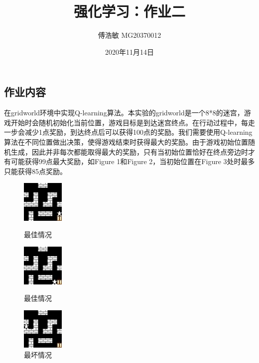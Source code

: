 \documentclass[a4paper,12pt]{article}
\begin{document}
\begin{CJK}{UTF8}{gbsn}

\title{强化学习：作业二}

\author{傅浩敏 MG20370012}

\date{2020年11月14日}

\maketitle

\section{作业内容}
在gridworld环境中实现Q-learning算法。本实验的gridworld是一个8*8的迷宫，游戏开始时会随机初始化当前位置，游戏目标是到达迷宫终点。在行动过程中，每走一步会减少1点奖励，到达终点后可以获得100点的奖励。我们需要使用Q-learning算法在不同位置做出决策，使得游戏结束时获得最大的奖励。由于游戏初始位置随机生成，因此并非每次都能取得最大的奖励，只有当初始位置恰好在终点旁边时才有可能获得99点最大奖励，如Figure 1和Figure 2，当初始位置在Figure 3处时最多只能获得85点奖励。
\begin{figure}[htbp]
	\centering
	\begin{minipage}[t]{0.25\textwidth}
		\centering
		\includegraphics[width=2cm]{code/obs_1.jpeg}
		\caption{最佳情况}
	\end{minipage}
	\begin{minipage}[t]{0.25\textwidth}
		\centering
		\includegraphics[width=2cm]{code/obs_2.jpeg}
		\caption{最佳情况}
	\end{minipage}
	\begin{minipage}[t]{0.25\textwidth}
		\centering
		\includegraphics[width=2cm]{code/obs_3.jpeg}
		\caption{最坏情况}
	\end{minipage}
\end{figure}


\end{CJK}
\end{document}
